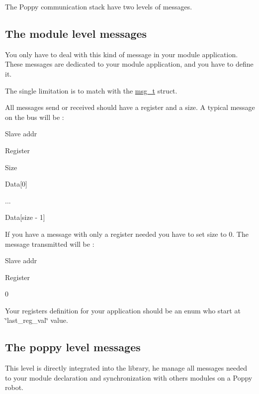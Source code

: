 The Poppy communication stack have two levels of messages.

\subsection*{The module level messages }

You only have to deal with this kind of message in your module application. These messages are dedicated to your module application, and you have to define it.

The single limitation is to match with the \hyperlink{structmsg__t}{msg\-\_\-t} struct.

All messages send or received should have a register and a size. A typical message on the bus will be \-:
\begin{DoxyItemize}
\item Slave addr
\item Register
\item Size
\item Data\mbox{[}0\mbox{]}
\item ...
\item Data\mbox{[}size -\/ 1\mbox{]}
\end{DoxyItemize}

If you have a message with only a register needed you have to set size to 0. The message transmitted will be \-:
\begin{DoxyItemize}
\item Slave addr
\item Register
\item 0
\end{DoxyItemize}

Your registers definition for your application should be an enum who start at \char`\"{}last\-\_\-reg\-\_\-val\char`\"{} value.

\subsection*{The poppy level messages }

This level is directly integrated into the library, he manage all messages needed to your module declaration and synchronization with others modules on a Poppy robot. 